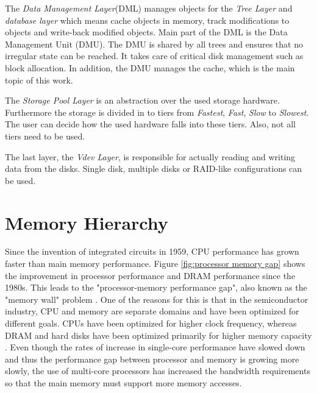 \documentclass[
	12pt,
	a4paper,
	abstract,
	bibliography=totoc,
	chapterprefix,
	headings=openright,
	numbers=endperiod,
	parskip=half,
	twoside,
]{scrreprt}
\begin{document}
The \emph{Data Management Layer}(DML) manages objects for the \emph{Tree Layer} and \emph{database layer} which means cache objects in memory, 
track modifications to objects and write-back modified objects.
Main part of the DML is the Data Management Unit (DMU).
The DMU is shared by all trees and ensures that no irregular state can be reached.
It takes care of critical disk management such as block allocation.
In addition, the DMU manages the cache, which is the main topic of this work.

The \emph{Storage Pool Layer} is an abstraction over the used storage hardware.
Furthermore the storage is divided in to tiers from \emph{Fastest}, \emph{Fast}, \emph{Slow} to \emph{Slowest}.
The user can decide how the used hardware falls into these tiers. Also, not all tiers need to be used.

The last layer, the \emph{Vdev Layer}, is responsible for actually reading and writing data from the disks.
Single disk, multiple disks or RAID-like configurations can be used.

\section{Memory Hierarchy}
Since the invention of integrated circuits in 1959, CPU performance has grown faster than main memory performance.
Figure \ref{fig:processor memory gap} shows the improvement in processor performance and DRAM performance since the 1980s.
This leads to the "processor-memory performance gap", also known as the "memory wall" problem \cite{wulf1995hitting}.
One of the reasons for this is that in the semiconductor industry, CPU and memory are separate domains and have been optimized for different goals.
CPUs have been optimized for higher clock frequency, whereas DRAM and hard disks have been optimized primarily for higher memory capacity \cite{cpu-mem-gap}.
Even though the rates of increase in single-core performance have slowed down and thus the performance gap between processor and memory is growing more slowly, the use of multi-core processors has increased the bandwidth requirements so that the main memory must support more memory accesses.
\end{document}
